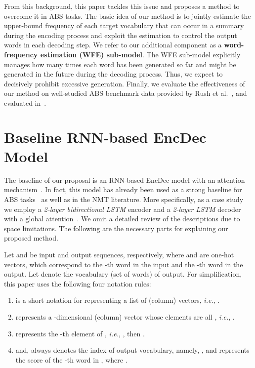 \documentclass[11pt]{article}
\begin{document}
 
   From this background, this paper tackles this issue and proposes a method to overcome it in ABS tasks.
The basic idea of our method is to jointly estimate the upper-bound frequency of each target vocabulary that can occur in a summary during the encoding process and exploit the estimation to control the output words in each decoding step.
We refer to our additional component as a {\bf word-frequency estimation (WFE) sub-model}.
The WFE sub-model explicitly manages how many times each word has been generated so far and might be generated in the future during the decoding process.
Thus, we expect to decisively prohibit excessive generation.
Finally, we evaluate the effectiveness of our method on well-studied ABS benchmark data provided by Rush et al.~, and evaluated in~\cite{chopra-auli-rush:2016:N16-1,nallapati-EtAl:2016:CoNLL,kikuchi-EtAl:2016:EMNLP2016,takase-EtAl:2016:EMNLP2016,DBLP:journals/corr/AyanaSLS16,gulcehre-EtAl:2016:P16-1}.


\section{Baseline RNN-based EncDec Model}
   The baseline of our proposal is an RNN-based EncDec model with an attention mechanism~\cite{luong-pham-manning:2015:EMNLP}.
In fact, this model has already been used as a strong baseline for ABS tasks~\cite{chopra-auli-rush:2016:N16-1,kikuchi-EtAl:2016:EMNLP2016} as well as in the NMT literature.
More specifically,  as a case study we employ a {\it 2-layer bidirectional LSTM} encoder and a {\it 2-layer LSTM} decoder with a global attention~\cite{DBLP:journals/corr/BahdanauCB14}.
We omit a detailed review of the descriptions due to space limitations.
The following are the necessary parts for explaining our proposed method.


   Let  and  be input and output sequences, respectively, where  and  are one-hot vectors, which correspond to the -th word in the input and the -th word in the output.
Let  denote the vocabulary (set of words) of output.
For simplification, this paper uses the following four notation rules:
   \begin{enumerate}
    \item  is a short notation for representing a list of (column) vectors, {\it i.e.}, .
    \item  represents a -dimensional (column) vector whose elements are all , {\it i.e.}, .
    \item  represents the -th element of , {\it i.e.}, , then .
    \item  and,  always denotes the index of output vocabulary, namely, , and  represents the score of the -th word in , where .
   \end{enumerate}
   
\end{document}
